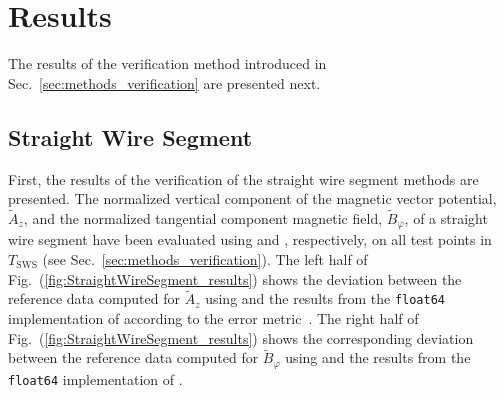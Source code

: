 \section{Results}
\label{sec:results}
The results of the verification method introduced in Sec.~\ref{sec:methods_verification}
are presented next.
\subsection{Straight Wire Segment}
First, the results of the verification of the straight wire segment methods are presented.
The normalized vertical component of the magnetic vector potential, $\tilde{A}_z$,
and the normalized tangential component magnetic field, $\tilde{B}_\varphi$, of a straight wire segment
have been evaluated using  and , respectively,
on all test points in $T_\mathrm{SWS}$ (see Sec.~\ref{sec:methods_verification}).
The left half of Fig.~(\ref{fig:StraightWireSegment_results}) shows the deviation
between the reference data computed for $\tilde{A}_z$ using 
and the results from the \texttt{float64} implementation of 
according to the error metric~.
The right half of Fig.~(\ref{fig:StraightWireSegment_results}) shows the corresponding deviation
between the reference data computed for $\tilde{B}_\varphi$ using 
and the results from the \texttt{float64} implementation of .
